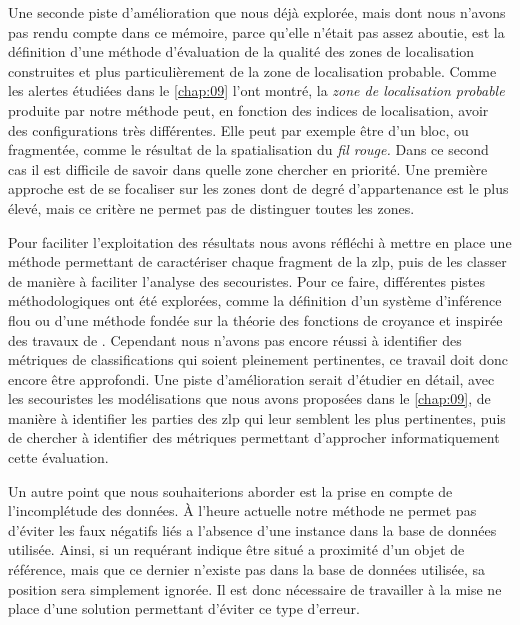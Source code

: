 Une seconde piste d'amélioration que nous déjà explorée, mais dont
nous n'avons pas rendu compte dans ce mémoire, parce qu'elle n'était
pas assez aboutie, est la définition d'une méthode d'évaluation de la
qualité des zones de localisation construites et plus particulièrement
de la zone de localisation probable. Comme les alertes étudiées dans
le \autoref{chap:09} l'ont montré, la \emph{zone de localisation
  probable} produite par notre méthode peut, en fonction des indices
de localisation, avoir des configurations très différentes. Elle peut
par exemple être d'un bloc, ou fragmentée, comme le résultat de la
spatialisation du \emph{fil rouge.} Dans ce second cas il est
difficile de savoir dans quelle zone chercher en priorité. Une
première approche est de se focaliser sur les zones dont de degré
d'appartenance est le plus élevé, mais ce critère ne permet pas de
distinguer toutes les zones.

Pour faciliter l'exploitation des résultats nous avons réfléchi à
mettre en place une méthode permettant de caractériser chaque fragment
de la \ac{zlp}, puis de les classer de manière à faciliter l'analyse
des secouristes. Pour ce faire, différentes pistes méthodologiques ont
été explorées, comme la définition d'un système d'inférence flou ou
d'une méthode fondée sur la théorie des fonctions de croyance
\autocite{Shafer1976} et inspirée des travaux de
\textcite{Olteanu2008}. Cependant nous n'avons pas encore réussi à
identifier des métriques de classifications qui soient pleinement
pertinentes, ce travail doit donc encore être approfondi. Une piste
d'amélioration serait d'étudier en détail, avec les secouristes les
modélisations que nous avons proposées dans le \autoref{chap:09}, de
manière à identifier les parties des \ac{zlp} qui leur semblent les
plus pertinentes, puis de chercher à identifier des métriques
permettant d'approcher informatiquement cette évaluation.

Un autre point que nous souhaiterions aborder est la prise en compte
de l'incomplétude des données. À l'heure actuelle notre méthode ne
permet pas d'éviter les faux négatifs liés a l'absence d'une instance
dans la base de données utilisée. Ainsi, si un requérant indique être
situé a proximité d'un objet de référence, mais que ce dernier
n'existe pas dans la base de données utilisée, sa position sera
simplement ignorée. Il est donc nécessaire de travailler à la mise ne
place d'une solution permettant d'éviter ce type d'erreur.

